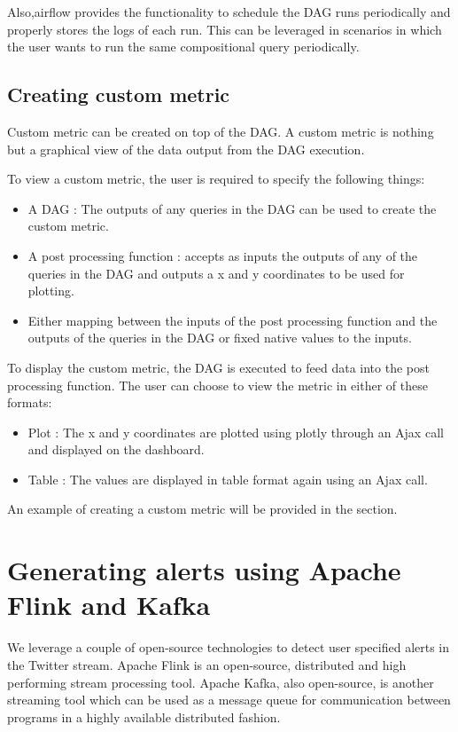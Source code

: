 \documentclass[letterpaper,10pt,english]{sphinxmanual}
\begin{document}
Also,airflow provides the functionality to schedule the DAG runs periodically and properly stores the logs of each run. This can be leveraged in scenarios in which the user wants to run the same compositional query periodically.


\section{Creating custom metric}
\label{\detokenize{dag:creating-custom-metric}}
Custom metric can be created on top of the DAG. A custom metric is nothing but a graphical view of the data output from the DAG execution.

To view a custom metric, the user is required to specify the following things:
\begin{itemize}
\item {} 
A DAG : The outputs of any queries in the DAG can be used to create the custom metric.

\item {} 
A post processing function : accepts as inputs the outputs of any of the queries in the DAG and outputs a x and y coordinates to be used for plotting.

\item {} 
Either mapping between the inputs of the post processing function and the outputs of the queries in the DAG or fixed native values to the inputs.

\end{itemize}

To display the custom metric, the DAG is executed to feed data into the post processing function. The user can choose to view the metric in either of these formats:
\begin{itemize}
\item {} 
Plot : The x and y coordinates are plotted using plotly through an Ajax call and displayed on the dashboard.

\item {} 
Table : The values are displayed in table format again using an Ajax call.

\end{itemize}

An example of creating a custom metric will be provided in the {\hyperref[\detokenize{dashboard_website:dashboard-website}]{}} section.


\chapter{Generating alerts using Apache Flink and Kafka}
\label{\detokenize{flink:generating-alerts-using-apache-flink-and-kafka}}\label{\detokenize{flink::doc}}
We leverage a couple of open-source technologies to detect user specified alerts in the Twitter stream. Apache Flink is an open-source, distributed and high performing stream processing tool. Apache Kafka, also open-source, is another streaming tool which can be used as a message queue for communication between programs in a highly available distributed fashion.
\end{document}
